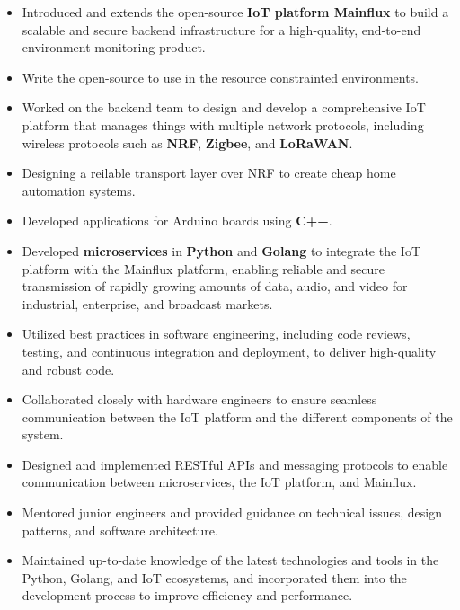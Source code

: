 \vspace{1cm}

\vspace{0.5cm}
\begin{itemize}
  \item Introduced and extends the open-source \textbf{IoT platform Mainflux} to build a scalable and secure backend
    infrastructure for a high-quality, end-to-end environment monitoring product.
  \item Write the open-source  to use in the resource constrainted environments.
  \item Worked on the backend team to design and develop a comprehensive IoT platform that manages things with multiple network protocols,
    including wireless protocols such as \textbf{NRF}, \textbf{Zigbee}, and \textbf{LoRaWAN}.
  \item Designing a reilable transport layer over NRF to create cheap home automation systems.
  \item Developed applications for Arduino boards using \textbf{C++}.
  \item Developed \textbf{microservices} in \textbf{Python} and \textbf{Golang} to integrate the IoT platform with the Mainflux platform,
    enabling reliable and secure transmission of rapidly growing amounts of data, audio, and video for industrial, enterprise, and broadcast markets.
  \item Utilized best practices in software engineering, including code reviews, testing, and continuous
    integration and deployment, to deliver high-quality and robust code.
  \item Collaborated closely with hardware engineers to ensure seamless communication between the IoT
    platform and the different components of the system.
  \item Designed and implemented RESTful APIs and messaging protocols to
    enable communication between microservices, the IoT platform, and Mainflux.
  \item Mentored junior engineers and provided guidance on technical issues,
    design patterns, and software architecture.
  \item Maintained up-to-date knowledge of the latest technologies and tools in the Python,
    Golang, and IoT ecosystems, and incorporated them into the development process to improve efficiency and performance.

\end{itemize}
